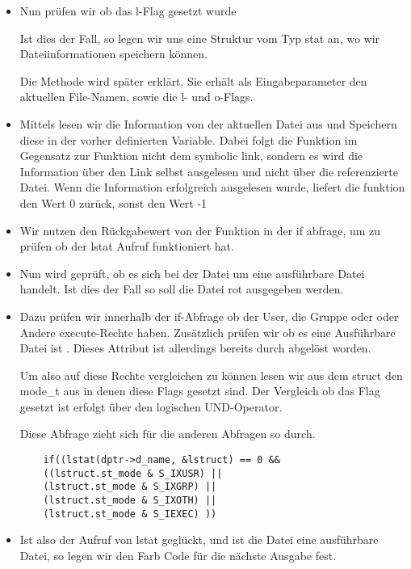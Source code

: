 \begin{itemize}
\item Nun prüfen wir ob das l-Flag gesetzt wurde 

Ist dies der Fall, so legen wir uns eine Struktur vom Typ stat an, wo
wir Dateiinformationen speichern können.

Die Methode  wird
später erklärt. Sie erhält als Eingabeparameter den aktuellen File-Namen, sowie
die l- und o-Flags.

\item Mittels  lesen wir die Information von der aktuellen Datei aus
und Speichern diese in der vorher definierten  Variable.
Dabei folgt die Funktion im Gegensatz zur Funktion  nicht dem symbolic link,
sondern es wird die Information über den Link selbst ausgelesen und nicht über die referenzierte Datei.
Wenn die Information erfolgreich ausgelesen wurde, liefert die funktion den Wert 0 zurück,
sonst den Wert -1
\item Wir nutzen den Rückgabewert von der Funktion   in der if abfrage,
um zu prüfen ob der lstat Aufruf funktioniert hat.
\item Nun wird geprüft, ob es sich bei der Datei um eine ausführbare Datei handelt.
Ist dies der Fall so soll die Datei rot ausgegeben werden.
\item Dazu prüfen wir innerhalb der if-Abfrage ob der User, die Gruppe oder
oder Andere execute-Rechte haben. Zusätzlich prüfen wir ob es eine
Ausführbare Datei ist . Dieses Attribut ist allerdings
bereits durch  abgelöst worden.

Um also auf diese Rechte vergleichen zu können lesen wir aus dem
struct den mode\_t aus in denen diese Flags gesetzt sind.
Der Vergleich ob das Flag gesetzt ist erfolgt über den logischen
UND-Operator.

Diese Abfrage zieht sich für die anderen Abfragen so durch.
\begin{lstlisting}
	if((lstat(dptr->d_name, &lstruct) == 0 &&
	((lstruct.st_mode & S_IXUSR) ||
	(lstruct.st_mode & S_IXGRP) ||
	(lstruct.st_mode & S_IXOTH) ||
	(lstruct.st_mode & S_IEXEC) ))
\end{lstlisting}

\item Ist also der Aufruf von lstat geglückt, und ist die Datei eine ausführbare
Datei, so legen wir den Farb Code für die nächste Ausgabe fest.


\end{itemize}
